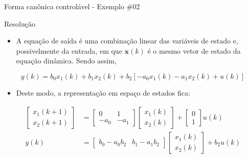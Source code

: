 \begin{frame}{Forma canônica controlável - Exemplo \#02}
\begin{block}{Resolução}
\begin{itemize}
    \item A equação de saída é uma combinação linear  das variáveis de estado e, possivelmente da entrada, em que $\bm{x}(k)$ é o mesmo vetor de estado da equação dinâmica. Sendo assim, 
\end{itemize}

$$y(k) = b_0 x_1(k) + b_1 x_2(k) + b_2[-a_0 x_1(k) -a_1 x_2(k) + u(k)]$$

\begin{itemize}
    \item Deste modo, a representação em espaço de estados fica:
\end{itemize}

\begin{align*}
    \begin{bmatrix} x_1(k+1) \\ x_2(k+1) \end{bmatrix}
    &=
    \begin{bmatrix}
    0 & 1 \\ -a_0 & -a_1
    \end{bmatrix}
    \begin{bmatrix}
    x_1(k) \\ x_2(k)
    \end{bmatrix}
    +
    \begin{bmatrix}
    0 \\ 1
    \end{bmatrix}
    u(k) \\
    y(k)
    &=
    \begin{bmatrix}
    b_0-a_0b_2 & b_1-a_1b_2
    \end{bmatrix}
    \begin{bmatrix}
    x_1(k) \\ x_2(k)
    \end{bmatrix}
    + b_2 u(k) 
\end{align*}
\end{block}
\end{frame}

